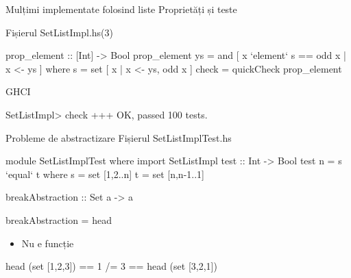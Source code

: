 \documentclass[handout,xcolor=pdftex,romanian,colorlinks]{beamer}
\begin{document}
\begin{frame}[fragile]{Mulțimi implementate folosind liste}
{Proprietăți și teste}
\begin{block}{Fișierul SetListImpl.hs\hfill (3)}
\begin{asciihs}
prop_element :: [Int] -> Bool
prop_element ys =
    and [ x `element` s == odd x | x <- ys ]
  where
    s = set [ x | x <- ys, odd x ]
check =
    quickCheck prop_element
\end{asciihs}
\end{block}
\begin{block}{GHCI}
\begin{asciihs}
SetListImpl> check
+++ OK, passed 100 tests.
\end{asciihs}
\end{block}
\end{frame}

\begin{frame}[fragile]{Probleme de abstractizare}
{Fișierul SetListImplTest.hs}
\begin{asciihs}
module SetListImplTest where
import SetListImpl
test :: Int -> Bool
test n =
   s `equal` t
  where
    s = set [1,2..n]
    t = set [n,n-1..1]

breakAbstraction :: Set a -> a
\end{asciihs}
\vspace{-2ex}
\begin{asciihs}
breakAbstraction = head
\end{asciihs}
\begin{itemize}
\item Nu e funcție
\end{itemize}
\begin{asciihs}
head (set [1,2,3]) == 1 /= 3 == head (set [3,2,1])
\end{asciihs}
\end{frame}
\end{document}
